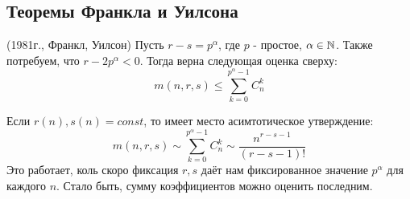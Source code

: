 \subsection{Теоремы Франкла и Уилсона}

\begin{theorem} (1981г., Франкл, Уилсон)
	Пусть $r - s = p^\alpha$, где $p$ - простое, $\alpha \in \mathbb{N}$. Также потребуем, что $r - 2p^\alpha < 0$. Тогда верна следующая оценка сверху:
	\[
		m(n, r, s) \le \sum_{k = 0}^{p^\alpha - 1} C_n^k
	\]
\end{theorem}

\begin{note}
	Если $r(n), s(n) = const$, то имеет место асимтотическое утверждение:
	\[
		m(n, r, s) \sim \sum_{k = 0}^{p^\alpha - 1} C_n^k \sim \frac{n^{r - s - 1}}{(r - s - 1)!}
	\]
	Это работает, коль скоро фиксация $r, s$ даёт нам фиксированное значение $p^\alpha$ для каждого $n$. Стало быть, сумму коэффициентов можно оценить последним.
\end{note}

